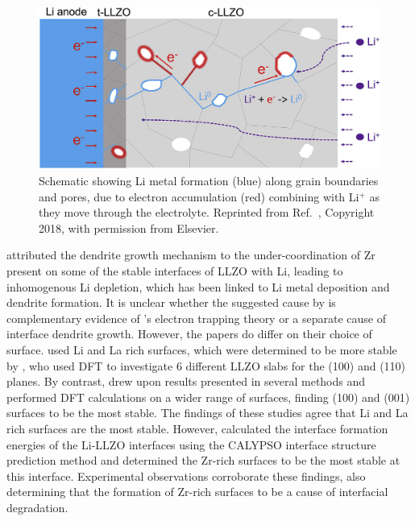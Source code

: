 \documentclass[../main.tex]{subfiles}
\begin{document}
\begin{figure}[H]
    \centering
    \includegraphics[scale=0.3]{figures/tian_grain_growth.png}
    \caption{Schematic showing Li metal formation (blue) along grain boundaries and pores, due to electron accumulation (red) combining with Li$^+$ as they move through the electrolyte. Reprinted from Ref.~, Copyright 2018, with permission from Elsevier.}
    \label{fig:tian2020}
\end{figure}

\citeauthor{Gao2020} attributed the dendrite growth mechanism to the under-coordination of Zr present on some of the stable interfaces of LLZO with Li,\cite{Gao2020} leading to inhomogenous Li depletion, which has been linked to Li metal deposition and dendrite formation.\cite{Shen2018, Aguesse2017, Krauskopf2019, Zhu2019, Tsai2016} It is unclear whether the suggested cause by \citeauthor{Gao2020} is complementary evidence of \citeauthor{Tian2018}'s electron trapping theory or a separate cause of interface dendrite growth. However, the papers do differ on their choice of surface. \citeauthor{Tian2018} used Li and La rich surfaces, which were determined to be more stable by \citeauthor{Thompson2017}, who used DFT to investigate 6 different LLZO slabs for the (100) and (110) planes.\cite{Thompson2017} By contrast, \citeauthor{Gao2020} drew upon results presented in several methods\cite{Thompson2017, Canepa2018, Yu2016a} and performed DFT calculations on a wider range of surfaces, finding (100) and (001) surfaces to be the most stable. The findings of these studies agree that Li and La rich surfaces are the most stable. However, \citeauthor{Gao2020} calculated the interface formation energies of the Li-LLZO interfaces using the CALYPSO interface structure prediction method\cite{Wang2012} and determined the Zr-rich surfaces to be the most stable at this interface.\cite{Gao2019} Experimental observations corroborate these findings, also determining that the formation of Zr-rich surfaces to be a cause of interfacial degradation.\cite{Zhu2019}
\end{document}
